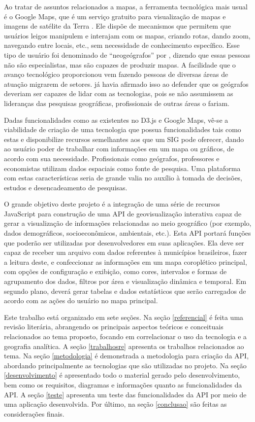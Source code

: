 \documentclass[12pt]{article}
\begin{document}
Ao tratar de assuntos relacionados a mapas, a ferramenta tecnológica mais usual é o Google Maps, que é um serviço gratuito para visualização de mapas e imagens de satélite da Terra \citep{googlemaps}. Ele dispõe de mecanismos que permitem que usuários leigos manipulem e interajam com os mapas, criando rotas, dando zoom, navegando entre locais, etc., sem necessidade de conhecimento específico. Esse tipo de usuário foi denominado de “neogeógrafos” por \citet{turner}, dizendo que essas pessoas não são especialistas, mas são capazes de produzir mapas. A facilidade que o avanço tecnológico proporcionou vem fazendo pessoas de diversas áreas de atuação migrarem de setores. \citet{armstrong} já havia afirmado isso ao defender que os geógrafos deveriam ser capazes de lidar com as tecnologias, pois se não assumissem as lideranças das pesquisas geográficas, profissionais de outras áreas o fariam.

Dadas funcionalidades como as existentes no D3.js e Google Maps, vê-se a viabilidade de criação de uma tecnologia que possua funcionalidades tais como estas e disponibilize recursos semelhantes aos que um SIG pode oferecer, dando ao usuário poder de trabalhar com informações em um mapa ou gráficos, de acordo com sua necessidade. Profissionais como geógrafos, professores e economistas utilizam dados espaciais como fonte de pesquisa. Uma plataforma com estas características seria de grande valia no auxílio à tomada de decisões, estudos e desencadeamento de pesquisas.

O grande objetivo deste projeto é a integração de uma série de recursos JavaScript para construção de uma API de geovisualização interativa capaz de gerar a visualização de informações relacionadas ao meio geográfico (por exemplo, dados demográficos, socioeconômicos, ambientais, etc.). Esta API portará funções que poderão ser utilizadas por desenvolvedores em suas aplicações. Ela deve ser capaz de receber um arquivo com dados referentes à municípios brasileiros, fazer a leitura deste, e confeccionar as informações em um mapa coroplético principal, com opções de configuração e exibição, como cores, intervalos e formas de agrupamento dos dados, filtros por área e visualização dinâmica e temporal. Em segundo plano, deverá gerar tabelas e dados estatísticos que serão carregados de acordo com as ações do usuário no mapa principal.

Este trabalho está organizado em sete seções. Na seção \ref{referencial} é feita uma revisão literária, abrangendo os principais aspectos teóricos e conceituais relacionados ao tema proposto, focando em correlacionar o uso da tecnologia e a geografia analítica. A seção \ref{trabalhosre} apresenta os trabalhos relacionados ao tema. Na seção \ref{metodologia} é demonstrada a metodologia para criação da API, abordando principalmente as tecnologias que são utilizadas no projeto. Na seção \ref{desenvolvimento} é apresentado todo o material gerado pelo desenvolvimento, bem como os requisitos, diagramas e informações quanto as funcionalidades da API. A seção \ref{teste} apresenta um teste das funcionalidades da API por meio de uma aplicação desenvolvida. Por último, na seção \ref{conclusao} são feitas as considerações finais.
\end{document}
